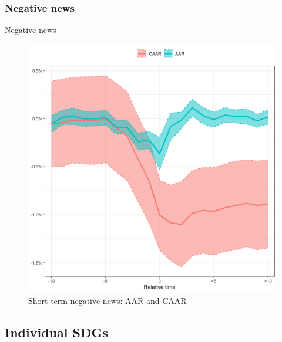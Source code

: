 \subsubsection{Negative news}
Negative news
\begin{figure} [H]
    \centering
    \includegraphics[scale=0.6]{Projekt/1.Figures analysis/ST_negative_all_CI.png}
    \caption{Short term negative news: AAR and CAAR}
    \label{fig:ST_pos_news}
\end{figure}


\subsection{Individual SDGs}

